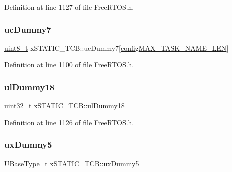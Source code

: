 Definition at line 1127 of file Free\+R\+T\+O\+S.\+h.

\mbox{\label{structxSTATIC__TCB_a308771ccd6723cad777695d84a0a2a30}} 
\subsubsection{\texorpdfstring{uc\+Dummy7}{ucDummy7}}
{\footnotesize\ttfamily \hyperlink{stdint_8h_aba7bc1797add20fe3efdf37ced1182c5}{uint8\+\_\+t} x\+S\+T\+A\+T\+I\+C\+\_\+\+T\+C\+B\+::uc\+Dummy7\mbox{[}\hyperlink{FreeRTOS_8h_ac388dc4041aab6997348828eb27fc1a8}{config\+M\+A\+X\+\_\+\+T\+A\+S\+K\+\_\+\+N\+A\+M\+E\+\_\+\+L\+EN}\mbox{]}}



Definition at line 1100 of file Free\+R\+T\+O\+S.\+h.

\mbox{\label{structxSTATIC__TCB_ade6781276f913dcd592ee0f6cce76c7e}} 
\subsubsection{\texorpdfstring{ul\+Dummy18}{ulDummy18}}
{\footnotesize\ttfamily \hyperlink{stdint_8h_a435d1572bf3f880d55459d9805097f62}{uint32\+\_\+t} x\+S\+T\+A\+T\+I\+C\+\_\+\+T\+C\+B\+::ul\+Dummy18}



Definition at line 1126 of file Free\+R\+T\+O\+S.\+h.

\mbox{\label{structxSTATIC__TCB_ab950bb498901ef7291e49086e5a2efd0}} 
\subsubsection{\texorpdfstring{ux\+Dummy5}{uxDummy5}}
{\footnotesize\ttfamily \hyperlink{pic32mx_2portmacro_8h_a646f89d4298e4f5afd522202b11cb2e6}{U\+Base\+Type\+\_\+t} x\+S\+T\+A\+T\+I\+C\+\_\+\+T\+C\+B\+::ux\+Dummy5}




